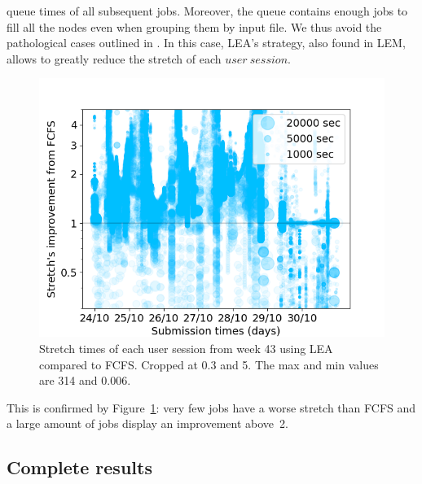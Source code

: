 \documentclass[sigconf,review,anonymous]{acmart}
\newcommand{\rev}[1]{{\color{black}{#1}}}
\newcommand{\us}{\ensuremath{\mathit{user~session}}\xspace}
\begin{document}
queue times of all subsequent jobs.
Moreover, the queue contains enough jobs to fill all the nodes even when grouping them by input file.
We thus avoid the pathological cases outlined in \rev{Section~\ref{sec.40}}.
In this case, LEA's strategy, also found in LEM, allows to greatly reduce the stretch of each \us.
\begin{figure}[t]\centering\includegraphics[width=0.9\linewidth]{../MBSS/plot/Stretch_times/Stretch_times_FCFS_LEA_2022-10-24->2022-10-30_V10000_anonymous_450_128_32_256_4_1024.png}\caption{Stretch times of each user session from week 43 using LEA compared to FCFS. Cropped at 0.3 and 5. The max and min values are 314 and 0.006.}\label{vs_fcfs_lea_43}\end{figure}
This is confirmed by Figure~\ref{vs_fcfs_lea_43}: very few jobs 
have a worse stretch than FCFS and a large amount of jobs display an improvement above~2.


\subsection{Complete results}
\end{document}
